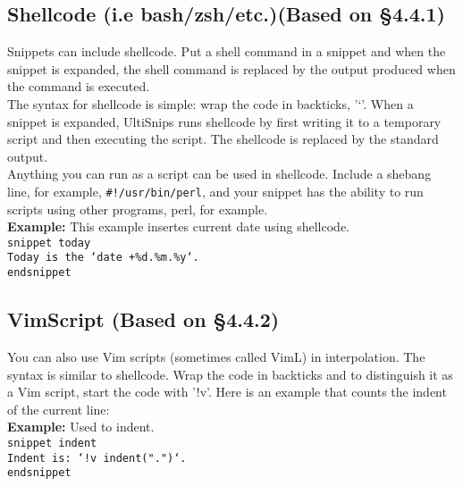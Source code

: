 \documentclass[11pt]{article}
\theoremstyle{plain}%
\theoremstyle{definition}
\theoremstyle{remark}
\begin{document}
	\subsection{Shellcode (i.e bash/zsh/etc.)(Based on \S4.4.1)}
	Snippets can include shellcode. Put a shell command in a snippet and when the snippet is expanded, the shell command is replaced by the output produced when the command is executed.\\
	The syntax for shellcode is simple: wrap the code in backticks, '`'. When a snippet is expanded, UltiSnips runs shellcode by first writing it to a temporary script and then executing the script. The shellcode is replaced by the standard output. \\
	Anything you can run as a script can be used in shellcode. Include a shebang line, for example, \texttt{\#!/usr/bin/perl}, and your snippet has the ability to run scripts using other programs, perl, for example.\\
	\textbf{Example:} This example insertes current date using shellcode. \\
	\texttt{snippet today\\
	Today is the `date +\%d.\%m.\%y`.\\
	endsnippet}
	\subsection{VimScript (Based on \S4.4.2)}
	You can also use Vim scripts (sometimes called VimL) in interpolation. The syntax is similar to shellcode. Wrap the code in backticks and to distinguish it as a Vim script, start the code with '!v'. Here is an example that counts the indent of the current line: \\
	\textbf{Example:} Used to indent. \\
	\texttt{snippet indent\\
	Indent is: `!v indent(".")`.\\
	endsnippet}
\end{document}
